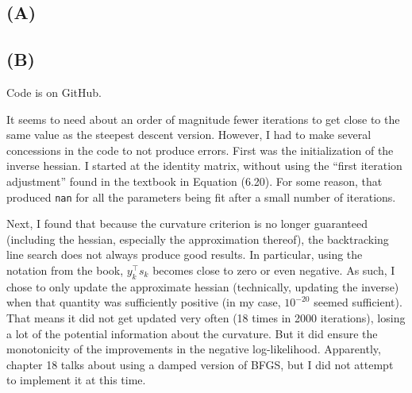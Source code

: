 \documentclass{article}
\begin{document}
\subsection{(A)}


\subsection{(B)}
Code is on GitHub.

It seems to need about an order of magnitude fewer iterations to get close to the same value as the steepest descent
version. However, I had to make several concessions in the code to not produce errors. First was the initialization
of the inverse hessian. I started at the identity matrix, without using the ``first iteration adjustment'' found in 
the textbook in Equation (6.20). For some reason, that produced \texttt{nan} for all the parameters being
fit after a small number of iterations.

Next, I found that because the curvature criterion is no longer guaranteed (including the hessian, especially
the approximation thereof), the backtracking line search does not always produce good results. In particular,
using the notation from the book, $y_k^\top s_k$ becomes close to zero or even negative. As such, I chose
to only update the approximate hessian (technically, updating the inverse) when that quantity was sufficiently
positive (in my case, $10^{-20}$ seemed sufficient). That means it did not get updated very often (18 times in 2000 iterations), losing a lot of the potential information about the curvature. But it did ensure the monotonicity of the
improvements in the negative log-likelihood. Apparently, chapter 18 talks about using a damped version
of BFGS, but I did not attempt to implement it at this time.
\end{document}
